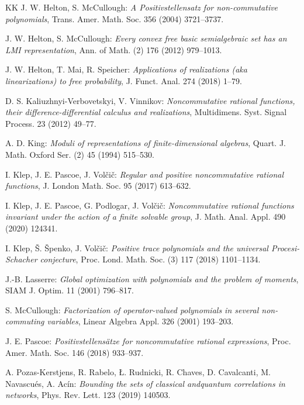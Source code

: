 \documentclass[12pt,a4paper]{amsart}
\theoremstyle{definition}
\theoremstyle{remark}
\numberwithin{equation}{section}
\begin{document}
\begin{thebibliography}{KK}
J. W. Helton, S. McCullough:
{\it A Positivstellensatz for non-commutative polynomials},
Trans. Amer. Math. Soc. 356 (2004) 3721--3737.

J. W.  Helton,  S. McCullough:
{\it Every convex free basic semialgebraic set has an LMI representation},
Ann. of Math. (2) 176 (2012) 979--1013.

J. W. Helton, T. Mai, R. Speicher:
{\it Applications of realizations (aka linearizations) to free probability},
J. Funct. Anal. 274 (2018) 1--79.

D. S. Kaliuzhnyi-Verbovetskyi, V. Vinnikov:
{\it Noncommutative rational functions, their difference-differential calculus and realizations}, 
Multidimens. Syst. Signal Process. 23 (2012) 49--77.

A. D. King:
{\it Moduli of representations of finite-dimensional algebras},
Quart. J. Math. Oxford Ser. (2) 45 (1994) 515--530.

I. Klep, J. E. Pascoe, J. Vol\v{c}i\v{c}:
{\it Regular and positive noncommutative rational functions},
J. London Math. Soc. 95 (2017) 613--632.

I. Klep, J. E. Pascoe, G. Podlogar, J. Vol\v{c}i\v{c}:
{\it Noncommutative rational functions invariant under the action of a finite solvable group},
J. Math. Anal. Appl. 490 (2020) 124341.

I. Klep, \v{S}. \v{S}penko, J. Vol\v{c}i\v{c}:
{\it Positive trace polynomials and the universal Procesi-Schacher conjecture},
Proc. Lond. Math. Soc. (3) 117 (2018) 1101--1134. 

J.-B. Lasserre:
{\it Global optimization with polynomials and the problem of moments}, 
SIAM J. Optim. 11 (2001) 796--817.

S. McCullough:
{\it Factorization of operator-valued polynomials in several non-commuting variables},
Linear Algebra Appl. 326 (2001) 193--203.

J. E. Pascoe:
{\it Positivstellens\"{a}tze for noncommutative rational expressions},
Proc. Amer. Math. Soc. 146 (2018) 933--937.

A. Pozas-Kerstjens, R. Rabelo, {\L}. Rudnicki, R. Chaves, D. Cavalcanti, M. Navascu\'es, A. Ac\'in: 
{\it Bounding the sets of classical andquantum correlations in networks}, 
Phys. Rev. Lett. 123 (2019) 140503.


\end{thebibliography}
\end{document}
